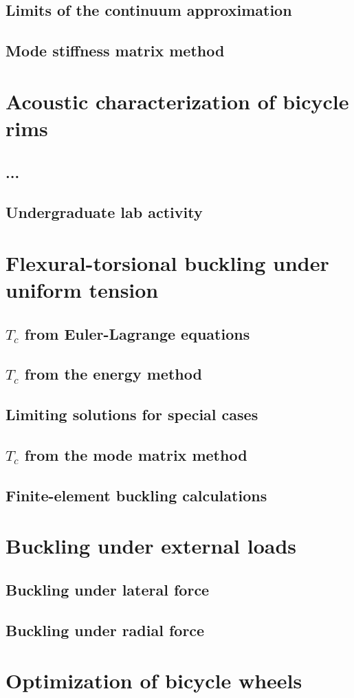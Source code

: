 \documentclass[12pt,letterpaper]{report}
\begin{document}
\section{Limits of the continuum approximation}
\section{Mode stiffness matrix method}


\chapter{Acoustic characterization of bicycle rims}
\section{...}
\section{Undergraduate lab activity}


\chapter{Flexural-torsional buckling under uniform tension}
\section{$T_c$ from Euler-Lagrange equations}
\section{$T_c$ from the energy method}
\section{Limiting solutions for special cases}
\section{$T_c$ from the mode matrix method}
\section{Finite-element buckling calculations}


\chapter{Buckling under external loads}
\section{Buckling under lateral force}
\section{Buckling under radial force}


\chapter{Optimization of bicycle wheels}
\end{document}
